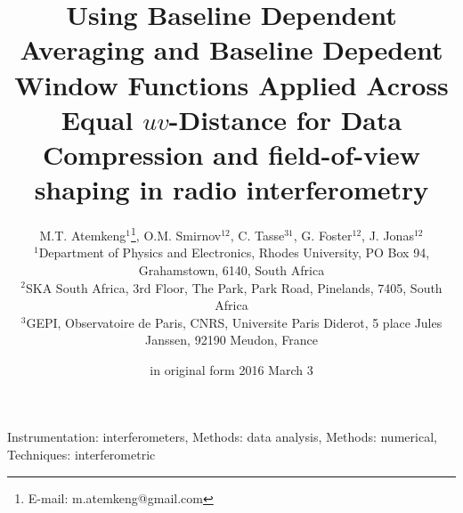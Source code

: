 \documentclass[useAMS,usenatbib]{mn2e}
\title[BDWFs for data compression and FoI shaping]{Using Baseline Dependent 
Averaging  and  Baseline Depedent Window Functions Applied Across Equal $uv$-Distance for Data Compression
 and field-of-view shaping in radio interferometry}
\author[M.T. Atemkeng, O.M. Smirnov, C. Tasse, G. Foster and J. Jonas]{M.T. 
Atemkeng$^{1}$\thanks{E-mail: m.atemkeng@gmail.com}, O.M. Smirnov$^{12}$, C. Tasse$^{31}$, G. Foster$^{12}$, J. Jonas$^{12}$ \\
$^1$Department of Physics and Electronics, Rhodes University, PO Box 94, Grahamstown, 6140, South Africa\\
$^2$SKA South Africa, 3rd Floor, The Park, Park Road, Pinelands, 7405, South Africa\\
$^3$GEPI, Observatoire de Paris, CNRS, Universite Paris Diderot, 5 place Jules Janssen, 92190 Meudon, France}
\begin{document}
\date{in original form 2016 March 3}

\pagerange{\pageref{firstpage}--\pageref{lastpage}} 

\maketitle

\label{firstpage}

\begin{abstract}

\end{abstract}
\begin{keywords}
Instrumentation: interferometers, Methods: data analysis, Methods: numerical, Techniques: interferometric
\end{keywords}
\end{document}
